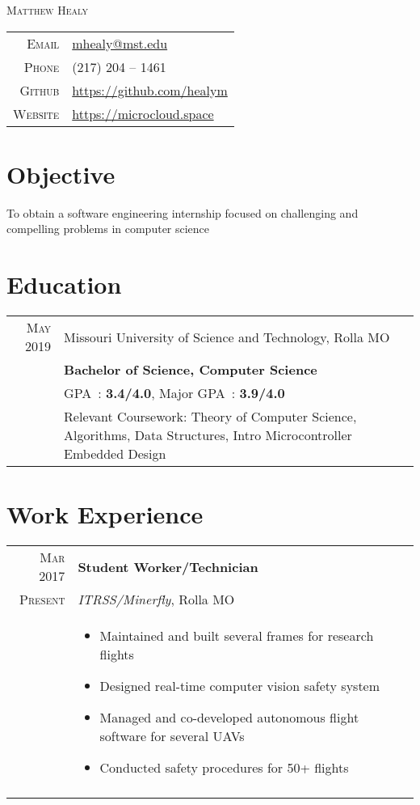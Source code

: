 \documentclass[a4paper,10pt]{article}
\newcommand{\br}{\\\multicolumn{2}{c}{}}
\begin{document}
\pagestyle{empty}

\par{\centering
    {\Huge \textsc{Matthew Healy}
}\bigskip\par}

\begin{center}
\begin{tabular}{rl}
    \textsc{Email } & \href{mailto:mhealy@mst.edu}{mhealy@mst.edu} \\
    \textsc{Phone }        & (217) 204 -- 1461  \\
    \textsc{Github }       & \url{https://github.com/healym} \\
    \textsc{Website }      & \url{https://microcloud.space}
\end{tabular}
\end{center}

\section{Objective}
To obtain a software engineering internship focused on challenging and compelling problems in computer science


\section{Education}
\begin{tabular}{r|p{15cm}}
    \textsc{May} 2019 & Missouri University of Science and Technology, Rolla MO  \\
                      & \textbf{Bachelor of Science, Computer Science} \\
                      & GPA~: \textbf{3.4/4.0}, Major GPA~: \textbf{3.9/4.0} \\
                      & Relevant Coursework:
                      Theory of Computer Science,
                      Algorithms,
                      Data Structures,
                      Intro Microcontroller Embedded Design
\end{tabular}


\section{Work Experience}
\begin{tabular}{r|p{15cm}}
    \textsc{Mar 2017} & \textbf{Student Worker/Technician} \\
    \textsc{Present}         & \textit{ITRSS/Minerfly}, Rolla MO \\ &
    \begin{itemize}
    \item{Maintained and built several frames for research flights}
    \item{Designed real-time computer vision safety system}
    \item{Managed and co-developed autonomous flight software for several UAVs}
    \item{Conducted safety procedures for 50+ flights}

    \end{itemize} \br\\

\end{tabular}
\end{document}
